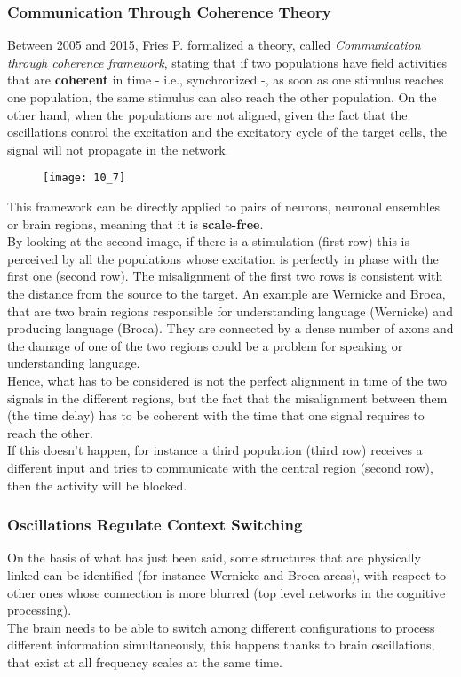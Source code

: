 \subsubsection{Communication Through Coherence Theory}
Between 2005 and 2015, Fries P. formalized a theory, called \textit{Communication through
coherence framework}, stating that if two populations have field activities that are
\textbf{coherent} in time - i.e., synchronized -, as soon as one stimulus reaches one population,
the same stimulus can also reach the other population. On the other hand, when the populations
are not aligned, given the fact that the oscillations control the excitation and the
excitatory cycle of the target cells, the signal will not propagate in the network.
\begin{figure}[H]
    \texttt{[image: 10\_7]}
    \centering
\end{figure}
This framework can be directly applied to pairs of neurons, neuronal ensembles or brain
regions, meaning that it is \textbf{scale-free}.\\
By looking at the second image, if there is a stimulation (first row) this is perceived by
all the populations whose excitation is perfectly in phase with the first one (second row).
The misalignment of the first two rows is consistent with the distance from the source to the
target. An example are Wernicke and Broca, that are two brain regions responsible for
understanding language (Wernicke) and producing language (Broca). They are connected by a
dense number of axons and the damage of one of the two regions could be a problem for
speaking or understanding language.\\
Hence, what has to be considered is not the perfect alignment in time of the two signals in
the different regions, but the fact that the misalignment between them (the time delay) has
to be coherent with the time that one signal requires to reach the other.\\
If this doesn't happen, for instance a third population (third row) receives a different
input and tries to communicate with the central region (second row), then the activity will
be blocked.
\subsubsection{Oscillations Regulate Context Switching}
On the basis of what has just been said, some structures that are physically linked can be
identified (for instance Wernicke and Broca areas), with respect to other ones whose
connection is more blurred (top level networks in the cognitive processing).\\
The brain needs to be able to switch among different configurations to process different
information simultaneously, this happens thanks to brain oscillations, that exist at all
frequency scales at the same time.
